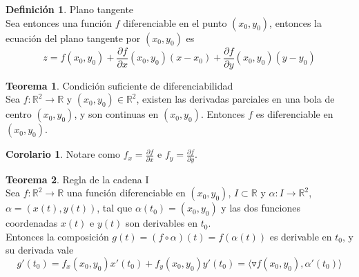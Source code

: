 \documentclass[10pt]{article}
\theoremstyle{definition}
\newtheorem{definition}{Definición}[section]
\newtheorem{theorem}{Teorema}[section]
\newtheorem{corollary}{Corolario}[theorem]
\begin{document}
\begin{center}
\end{center}
\begin{definition}{Plano tangente}
    \\Sea entonces una función $f$ diferenciable en el punto $(x_0,y_0)$, entonces la ecuación del plano tangente por $(x_0,y_0)$ es $$z=f(x_0,y_0)+\frac{\partial f}{\partial x}(x_0,y_0)(x-x_0)+\frac{\partial f}{\partial y}(x_0,y_0)(y-y_0)$$
\end{definition}
\begin{theorem}{Condición suficiente de diferenciabilidad}
    \\Sea $f:\mathbb{R}^2\to\mathbb{R}$ y $(x_0,y_0)\in\mathbb{R}^2$, existen las derivadas parciales en una bola de centro $(x_0,y_0)$, y son continuas en $(x_0,y_0)$. Entonces $f$ es diferenciable en $(x_0,y_0)$.
\end{theorem}
\begin{corollary}
    Notare como $f_x=\frac{\partial f}{\partial x}$ e $f_y=\frac{\partial f}{\partial y}$.
\end{corollary}
\begin{theorem}{Regla de la cadena I}
    \\Sea $f:\mathbb{R}^2\to\mathbb{R}$ una función diferenciable en $(x_0,y_0)$, $I\subset\mathbb{R}$ y $\alpha:I\to\mathbb{R}^2$, $\alpha=(x(t),y(t))$, tal que $\alpha(t_0)=(x_0,y_0)$ y las dos funciones coordenadas $x(t)$ e $y(t)$ son derivables en $t_0$.\\
    Entonces la composición $g(t)=(f\circ\alpha)(t)=f(\alpha(t))$ es derivable en $t_0$, y su derivada vale $$g'(t_0)=f_x(x_0,y_0)x'(t_0)+f_y(x_0,y_0)y'(t_0)=\langle\triangledown f(x_0,y_0),\alpha'(t_0)\rangle$$
\end{theorem}
\end{document}

